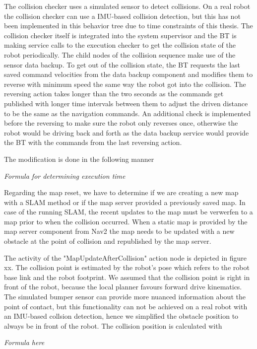 The collision checker uses a simulated sensor to detect collisions. On a real robot the collision checker can use a IMU-based collision detection, but this has not been implemented in this behavior tree due to time constraints of this thesis. The collision checker itself is integrated into the system supervisor and the BT is making service calls to the execution checker to get the collision state of the robot periodically. 
The child nodes of the collision sequence make use of the sensor data backup. 
To get out of the collision state, the BT requests the last saved command velocities from the data backup component and modifies them to reverse with minimum speed the same way the robot got into the collision. The reversing action takes longer than the two seconds as the commands get published with longer time intervals between them to adjust the driven distance to be the same as the navigation commands. An additional check is implemented before the reversing to make sure the robot only reverses once, otherwise the robot would be driving back and forth as the data backup service would provide the BT with the commands from the last reversing action. 

The modification is done in the following manner

\textit{Formula for determining execution time}

Regarding the map reset, we have to determine if we are creating a new map with a SLAM method or if the map server provided a previously saved map. 
In case of the running SLAM, the recent updates to the map must be verwerfen to a map prior to when the collision occurred.
When a static map is provided by the map server component from Nav2 the map needs to be updated with a new obstacle at the point of collision and republished by the map server. 

The activity of the "MapUpdateAfterCollision" action node is depicted in figure xx. The collision point is estimated by the robot's pose which refers to the robot base link and the robot footprint. We assumed that the collision point is right in front of the robot, because the local planner favours forward drive kinematics. The simulated bumper sensor can provide more nuanced information about the point of contact, but this functionality can not be achieved on a real robot with an IMU-based collsion detection, hence we simplified the obstacle position to always be in front of the robot. 
The collision position is calculated with 

\textit{Formula here}

